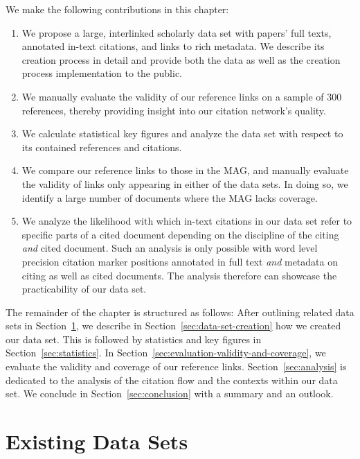 We make the following contributions in this chapter:
\begin{enumerate}
    \item We propose a large, interlinked scholarly data set with papers' full texts, annotated in-text citations, and links to rich metadata. We describe its creation process in detail and provide both the data as well as the creation process implementation to the public. 
    \item We manually evaluate the validity of our reference links on a sample of 300 references, thereby providing insight into our citation network's quality.
    \item We calculate statistical key figures and analyze the data set with respect to its contained references and citations.
    \item We compare our reference links to those in the MAG, and manually evaluate the validity of links only appearing in either of the data sets. In doing so, we identify a large number of documents where the MAG lacks coverage.
    \item We analyze the likelihood with which in-text citations in our data set refer to specific parts of a cited document depending on the discipline of the citing \emph{and} cited document. Such an analysis is only possible with word level precision citation marker positions annotated in full text \emph{and} metadata on citing as well as cited documents. The analysis therefore can showcase the practicability of our data set.
\end{enumerate}

The remainder of the chapter is structured as follows: After outlining related data sets in Section~\ref{sec:related-work}, we describe in Section~\ref{sec:data-set-creation} how we created our data set. This is followed by statistics and key figures in Section~\ref{sec:statistics}. In Section~\ref{sec:evaluation-validity-and-coverage}, we evaluate the validity and coverage of our reference links. Section~\ref{sec:analysis} is dedicated to the analysis of the citation flow and the contexts within our data set. We conclude in Section~\ref{sec:conclusion} with a summary and an outlook.

\section{Existing Data Sets}
\label{sec:related-work}

